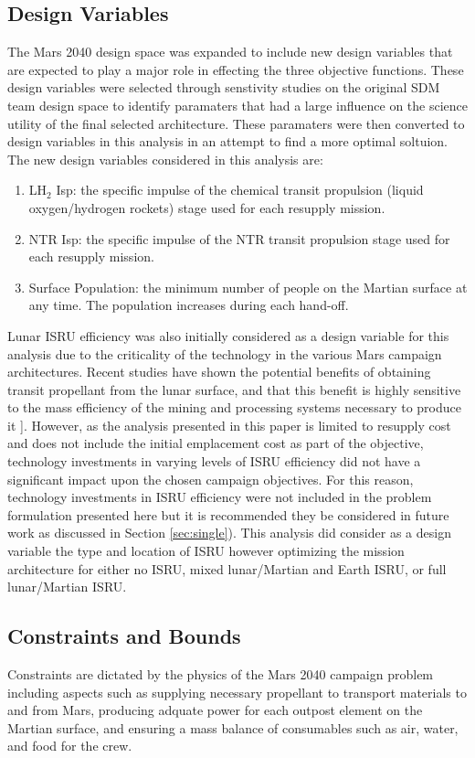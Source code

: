 \documentclass[]{aiaa-pretty}
\begin{document}
\subsection{Design Variables}
\label{sec:DVs}
The Mars 2040 design space was expanded to include new design variables that are expected to play a major role in effecting the three objective functions. These design variables were selected through senstivity studies on the original SDM team design space to identify paramaters that had a large influence on the science utility of the final selected architecture. These paramaters were then converted to design variables in this analysis in an attempt to find a more optimal soltuion. The new design variables considered in this analysis are:
\begin{enumerate}
\item LH$_2$ Isp: the specific impulse of the chemical transit propulsion (liquid oxygen/hydrogen rockets) stage used for each resupply mission.
\item NTR Isp: the specific impulse of the NTR transit propulsion stage used for each resupply mission.
\item Surface Population: the minimum number of people on the Martian surface at any time. The population increases during each hand-off.
\end{enumerate} 
Lunar ISRU efficiency was also initially considered as a design variable for this analysis due to the criticality of the technology in the various Mars campaign architectures. Recent studies have shown the potential benefits of obtaining transit propellant from the lunar surface, and that this benefit is highly sensitive to the mass efficiency of the mining and processing systems necessary to produce it \cite{ho2014dynamic}]. However, as the analysis presented in this paper is limited to resupply cost and does not include the initial emplacement cost as part of the objective, technology investments in varying levels of ISRU efficiency did not have a significant impact upon the chosen campaign objectives. For this reason, technology investments in ISRU efficiency were not included in the problem formulation presented here but it is recommended they be considered in future work as discussed in Section \ref{sec:single}). This analysis did consider as a design variable the type and location of ISRU however optimizing the mission architecture for either no ISRU, mixed lunar/Martian and Earth ISRU, or full lunar/Martian ISRU.

\subsection{Constraints and Bounds}
\label{sec:constraints}
Constraints are dictated by the physics of the Mars 2040 campaign problem including aspects such as supplying necessary propellant to transport materials to and from Mars, producing adquate power  for each outpost element on the Martian surface, and ensuring a mass balance of consumables such as air, water, and food for the crew. 
\end{document}
